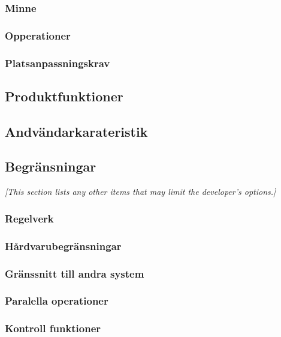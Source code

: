 \documentclass{article}
\begin{document}
\begin{enumerate}
\subsubsection{Minne}
\label{subsec:Minne}
\subsubsection{Opperationer}
\label{subsec:Opperationer}
\subsubsection{Platsanpassningskrav}
\label{subsec:Platsanpassningskrav}
\subsection{Produktfunktioner}
\label{subsec:Produktfunktioner}
\subsection{Andvändarkarateristik}
\label{subsec:Andvandarkarateristik}

\subsection{Begränsningar}
\label{subsec:Begransningar}
\emph{[This section lists any other items that may limit the developer's
  options.]}


\subsubsection{Regelverk}
\label{subsec:Regelverk}
\subsubsection{Hårdvarubegränsningar}
\label{subsec:Hardvarubegransningar}
\subsubsection{Gränssnitt till andra system}
\label{subsec:Granssnitt till andra system}
\subsubsection{Paralella operationer}
\label{subsec:Paralella operationer}
\subsubsection{Kontroll funktioner}
\label{subsec:Kontroll funktioner}

\end{enumerate}
\end{document}
